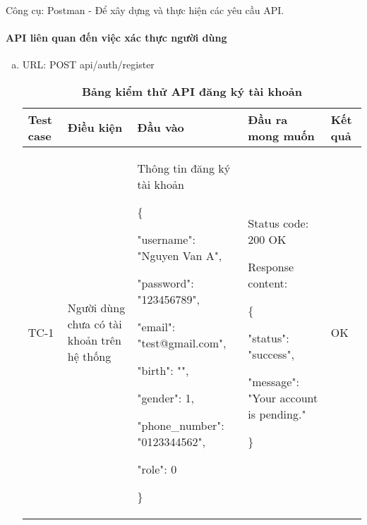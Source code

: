 Công cụ: Postman - Để xây dựng và thực hiện các yêu cầu API.

\paragraph{API liên quan đến việc xác thực người dùng}
\mbox{}



\begin{enumerate}[a)]
  \item URL: POST api/auth/register
  
  \break
  \begin{xltabular}{\textwidth}{
    | >{\raggedright\arraybackslash}p{1cm}
    | >{\raggedright\arraybackslash}p{2.5cm}
    | >{\raggedright\arraybackslash}X
    | >{\raggedright\arraybackslash}X
    | >{\raggedright\arraybackslash}p{1cm}|
    }
    \caption{\bfseries \fontsize{12pt}{0pt}\selectfont Bảng kiểm thử API đăng ký tài khoản}
    \\
    \hline
    \bfseries Test case    &\bfseries Điều kiện   &\bfseries Đầu vào 
    &\bfseries Đầu ra mong muốn &\bfseries Kết quả\\ \hline
  
  
    TC-1
    & Người dùng chưa có tài khoản trên hệ thống
    & Thông tin đăng ký tài khoản

    \{

    "username": "Nguyen Van A",

    "password": "123456789",

    "email": "test@gmail.com",

    "birth": "",

    "gender": 1,

    "phone\_number": "0123344562",

    "role": 0

   \}
  
    & 
  
    Status code: 200 OK
  
      Response content:
  
      \{
  
    "status": "success",
  
    "message": "Your account is pending."
  
    \}
    
    & OK
  
    \\ \hline
  

\end{xltabular}
\end{enumerate}
